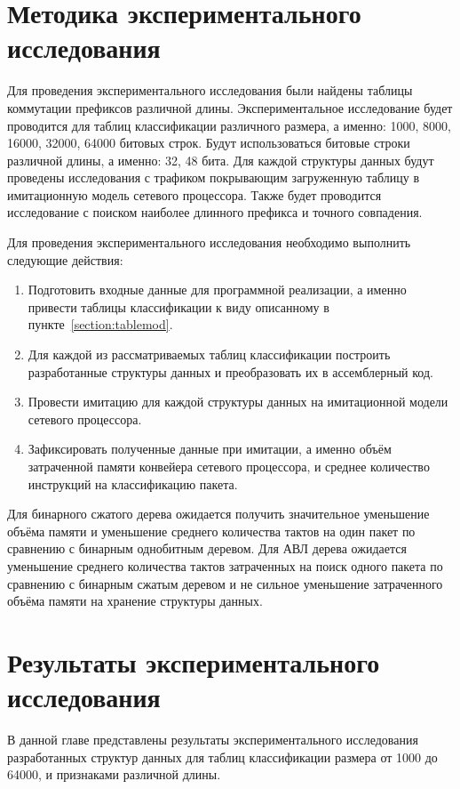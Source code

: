 \documentclass[conference]{IEEEtran}
\begin{document}
    \section{Методика экспериментального исследования}
            Для проведения экспериментального исследования были найдены таблицы коммутации префиксов различной длины. Экспериментальное исследование будет проводится
            для таблиц классификации различного размера, а именно: 1000, 8000, 16000, 32000, 64000 битовых строк. Будут использоваться битовые строки различной длины, а именно:
            32, 48 бита. Для каждой структуры данных будут проведены исследования с трафиком покрывающим загруженную таблицу в имитационную модель сетевого процессора.
            Также будет проводится исследование с поиском наиболее длинного префикса и точного совпадения.
            
            Для проведения экспериментального исследования необходимо выполнить следующие действия:
            \begin{enumerate}
                \item Подготовить входные данные для программной реализации, а именно привести таблицы классификации к виду описанному в пункте~\ref{section:tablemod}.
                \item Для каждой из рассматриваемых таблиц классификации построить разработанные структуры данных и преобразовать их в ассемблерный код.
                \item Провести имитацию для каждой структуры данных на имитационной модели сетевого процессора.
                \item Зафиксировать полученные данные при имитации, а именно объём затраченной памяти конвейера сетевого процессора, и среднее количество инструкций
                    на классификацию пакета.
            \end{enumerate}

            Для бинарного сжатого дерева ожидается получить значительное уменьшение объёма памяти и уменьшение среднего количества тактов на один пакет 
            по сравнению с бинарным однобитным деревом.
            Для АВЛ дерева ожидается уменьшение среднего количества тактов затраченных на поиск одного пакета по сравнению с бинарным сжатым деревом и 
            не сильное уменьшение затраченного объёма памяти на хранение структуры данных.
    \section{Результаты экспериментального исследования}
        В данной главе представлены результаты экспериментального исследования разработанных структур данных для таблиц классификации размера от 1000 до 64000, 
        и признаками различной длины.
\end{document}
